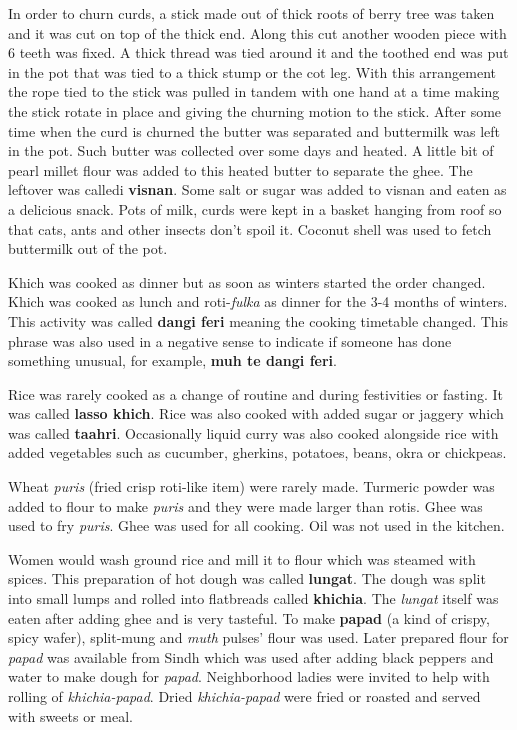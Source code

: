 In order to churn curds, a stick made out of thick roots of berry tree was
taken and it was cut on top of the thick end. Along this cut another wooden
piece with 6 teeth was fixed. A thick thread was tied around it and the toothed
end was put in the pot that was tied to a thick stump or the cot leg. With this
arrangement the rope tied to the stick was pulled in tandem with one hand at a
time making the stick rotate in place and giving the churning motion to the
stick. After some time when the curd is churned the butter was separated and
buttermilk was left in the pot. Such butter was collected over some days and
heated. A little bit of pearl millet flour was added to this heated butter to
separate the ghee. The leftover was calledi \textbf{visnan}. Some salt or sugar
was added to visnan and eaten as a delicious snack. Pots of milk, curds were
kept in a basket hanging from roof so that cats, ants and other insects don't
spoil it. Coconut shell was used to fetch buttermilk out of the pot.

Khich was cooked as dinner but as soon as winters started the order changed.
Khich was cooked as lunch and roti-\textit{fulka} as dinner for the 3-4 months
of winters. This activity was called \textbf{dangi feri} meaning the cooking
timetable changed. This phrase was also used in a negative sense to indicate if
someone has done something unusual, for example, \textbf{muh te dangi feri}.

Rice was rarely cooked as a change of routine and during festivities or
fasting. It was called \textbf{lasso khich}. Rice was also cooked with added
sugar or jaggery which was called \textbf{taahri}. Occasionally liquid curry
was also cooked alongside rice with added vegetables such as cucumber,
gherkins, potatoes, beans, okra or chickpeas.

Wheat \textit{puris} (fried crisp roti-like item) were rarely made. Turmeric
powder was added to flour to make \textit{puris} and they were made larger than
rotis. Ghee was used to fry \textit{puris}. Ghee was used for all cooking. Oil
was not used in the kitchen.

Women would wash ground rice and mill it to flour which was steamed with
spices. This preparation of hot dough was called \textbf{lungat}. The dough was
split into small lumps and rolled into flatbreads called \textbf{khichia}. The
\textit{lungat} itself was eaten after adding ghee and is very tasteful. To
make \textbf{papad} (a kind of crispy, spicy wafer), split-mung and \textit{muth} pulses' flour was used.
Later prepared flour for \textit{papad} was
available from Sindh which was used after adding black peppers and
water to make dough for \textit{papad}. Neighborhood ladies were
invited to help with rolling of \textit{khichia-papad}. Dried
\textit{khichia-papad} were fried or roasted and served with sweets or
meal. 

